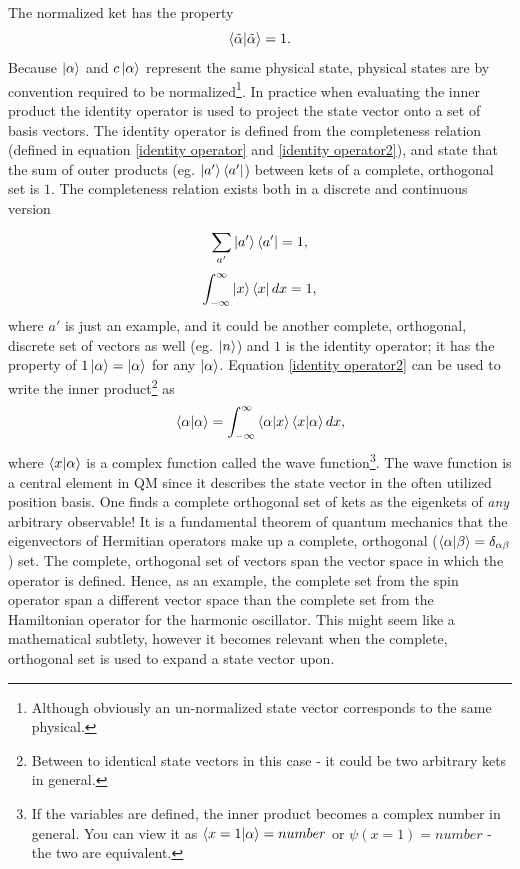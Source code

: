 The normalized ket has the property
\begin{equation}
	\braket{\tilde{\alpha}|\tilde{\alpha}}=1.
\end{equation} 
Because $\ket{\alpha}$ and $c\ket{\alpha}$ represent the same physical state, physical states are by convention required to be normalized\footnote{Although obviously an un-normalized state vector corresponds to the same physical.}. In practice when evaluating the inner product the identity operator is used to project the state vector onto a set of basis vectors. The identity operator is defined from the completeness relation (defined in equation \eqref{identity operator} and \eqref{identity operator2}), and state that the sum of outer products (eg. $\ket{a'}\bra{a'}$) between kets of a complete, orthogonal set is $1$. The completeness relation exists both in a discrete and continuous version
\begin{equation}
	\sum_{a'}^{}\ket{a'}\bra{a'}=1,
	\label{identity operator}
\end{equation}  
\begin{equation}
	\int_{-\infty}^{\infty}\ket{x}\bra{x}dx=1,
	\label{identity operator2}
\end{equation} 
where $a'$ is just an example, and it could be another complete, orthogonal, discrete set of vectors as well (eg. $\ket{n}$) and $1$ is the identity operator; it has the property of  $1\ket{\alpha}=\ket{\alpha}$ for any $\ket{\alpha}$. Equation \eqref{identity operator2} can be used to write the inner product\footnote{Between to identical state vectors in this case - it could be two arbitrary kets in general.} as
\begin{equation}
	\braket{\alpha|\alpha}=\int_{-\infty}^{\infty}\braket{\alpha|x}\braket{x|\alpha}dx,
\end{equation} 
where $\braket{x|\alpha}$ is a complex function called the wave function\footnote{If the variables are defined, the inner product becomes a complex number in general. You can view it as $\braket{x=1|\alpha}=number$ or $\psi(x=1)=number$ - the two are equivalent.}. The wave function is a central element in QM since it describes the state vector in the often utilized position basis. One finds a complete orthogonal set of kets as the eigenkets of \emph{any} arbitrary observable! It is a fundamental theorem of quantum mechanics that the eigenvectors of Hermitian operators make up a complete, orthogonal ($\braket{\alpha|\beta}=\delta_{\alpha\beta}$) set. The complete, orthogonal set of vectors span the vector space in which the operator is defined. Hence, as an example, the complete set from the spin operator span a different vector space than the complete set from the Hamiltonian operator for the harmonic oscillator. This might seem like a mathematical subtlety, however it becomes relevant when the complete, orthogonal set is used to expand a state vector upon.

